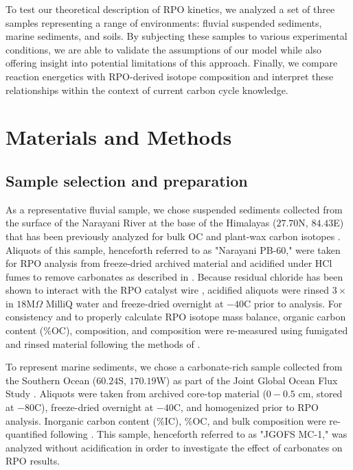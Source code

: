 To test our theoretical description of RPO kinetics, we analyzed a set of three samples representing a range of environments: fluvial suspended sediments, marine sediments, and soils. By subjecting these samples to various experimental conditions, we are able to validate the assumptions of our model while also offering insight into potential limitations of this approach. Finally, we compare reaction energetics with RPO-derived isotope composition and interpret these relationships within the context of current carbon cycle knowledge.

\section{Materials and Methods}

\subsection{Sample selection and preparation}

As a representative fluvial sample, we chose suspended sediments collected from the surface of the Narayani River at the base of the Himalayas ($27.70$\textdegree N, $84.43$\textdegree E) that has been previously analyzed for bulk OC and plant-wax carbon isotopes \citep{Galy:2008jw,Galy:2011hk,Galy:2011ix}. Aliquots of this sample, henceforth referred to as "Narayani PB-60," were taken for RPO analysis from freeze-dried archived material and acidified under HCl fumes to remove carbonates as described in \citet{Whiteside:2011jea}. Because residual chloride has been shown to interact with the RPO catalyst wire \citep{Hemingway:2016rc}, acidified aliquots were rinsed $3\times$ in $18$M$\Omega$ MilliQ water and freeze-dried overnight at $-40$\textdegree C prior to analysis. For consistency and to properly calculate RPO isotope mass balance, organic carbon content (\%OC),  composition, and  composition were re-measured using fumigated and rinsed material following the methods of \citet{McNichol:1994dt,McNichol:1994ty}.

To represent marine sediments, we chose a carbonate-rich sample collected from the Southern Ocean ($60.24$\textdegree S, $170.19$\textdegree W) as part of the Joint Global Ocean Flux Study \citep[JGOFS;][]{Sayles:2001ua}. Aliquots were taken from archived core-top material ($0 - 0.5$ cm, stored at $-80$\textdegree C), freeze-dried overnight at $-40$\textdegree C, and homogenized prior to RPO analysis. Inorganic carbon content (\%IC), \%OC, and bulk  composition were re-quantified following \citet{McNichol:1994dt}. This sample, henceforth referred to as "JGOFS MC-1," was analyzed without acidification in order to investigate the effect of carbonates on RPO results.

